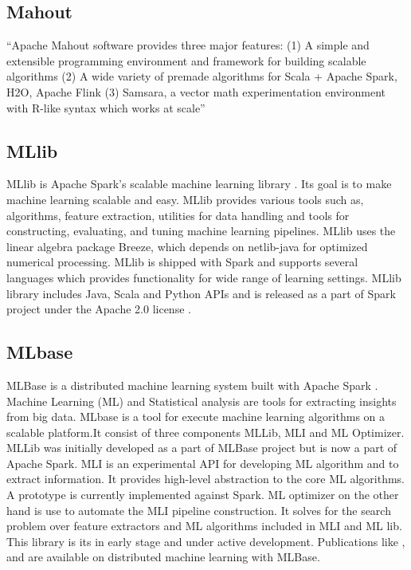 \subsection{Mahout \cite{www-mahout}}

    ``Apache Mahout software provides three major features:
    (1) A simple and extensible programming environment and framework
    for building scalable algorithms
    (2) A wide variety of premade algorithms for Scala + Apache Spark,
    H2O, Apache Flink
    (3) Samsara, a vector math experimentation environment with R-like
    syntax which works at scale''


\subsection{MLlib}

    MLlib is Apache Spark’s scalable machine learning library
    \cite{www-mllib}. Its goal is to make machine learning scalable
    and easy. MLlib provides various tools such as, algorithms,
    feature extraction, utilities for data handling and tools for
    constructing, evaluating, and tuning machine learning
    pipelines. MLlib uses the linear algebra package Breeze, which
    depends on netlib-java for optimized numerical processing. MLlib
    is shipped with Spark and supports several languages which
    provides functionality for wide range of learning settings. MLlib
    library includes Java, Scala and Python APIs and is released as a
    part of Spark project under the Apache 2.0 license
    \cite{MLlib-article}.

\subsection{MLbase}
    
    MLBase \cite{www-mlbase} is a distributed machine learning
    system built with Apache Spark \cite{www-spark}. Machine Learning
    (ML) and Statistical analysis are tools for extracting insights
    from big data. MLbase is a tool for execute machine learning
    algorithms on a scalable platform.It consist of three components
    MLLib, MLI and ML Optimizer. MLLib was initially developed as a
    part of MLBase project but is now a part of Apache Spark. MLI is
    an experimental API for developing ML algorithm and to extract
    information. It provides high-level abstraction to the core ML
    algorithms. A prototype is currently implemented against Spark. ML
    optimizer on the other hand is use to automate the MLI pipeline
    construction. It solves for the search problem over feature
    extractors and ML algorithms included in MLI and ML lib. This
    library is its in early stage and under active
    development. Publications like \cite{mlbasepub1},
    \cite{mlbasepub2} and \cite{mlbasepub3} are available on
    distributed machine learning with MLBase.


